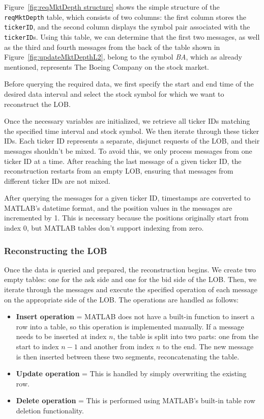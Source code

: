 \documentclass[a4paper,oneside,onecolumn,12pt]{book}
\begin{document}
			Figure~\ref{fig:reqMktDepth structure} shows the simple structure of the \texttt{reqMktDepth} table, which consists of two columns: the first column stores the \texttt{tickerID}, and the second column displays the symbol pair associated with the \texttt{tickerID}s. Using this table, we can determine that the first two messages, as well as the third and fourth messages from the back of the table shown in Figure~\ref{fig:updateMktDepthL2}, belong to the symbol \textit{BA}, which as already mentioned, represents The Boeing Company on the stock market.

			Before querying the required data, we first specify the start and end time of the desired data interval and select the stock symbol for which we want to reconstruct the LOB.

			Once the necessary variables are initialized, we retrieve all ticker IDs matching the specified time interval and stock symbol. We then iterate through these ticker IDs. Each ticker ID represents a separate, disjunct requests of the LOB, and their messages shouldn't be mixed. To avoid this, we only process messages from one ticker ID at a time. After reaching the last message of a given ticker ID, the reconstruction restarts from an empty LOB, ensuring that messages from different ticker IDs are not mixed.

			After querying the messages for a given ticker ID, timestamps are converted to MATLAB's datetime format, and the position values in the messages are incremented by 1. This is necessary because the positions originally start from index 0, but MATLAB tables don't support indexing from zero.

		\subsubsection{Reconstructing the LOB}  
			Once the data is queried and prepared, the reconstruction begins. We create two empty tables: one for the ask side and one for the bid side of the LOB. Then, we iterate through the messages and execute the specified operation of each message on the appropriate side of the LOB. The operations are handled as follows:
			\begin{itemize}
				\item \textbf{Insert operation} = MATLAB does not have a built-in function to insert a row into a table, so this operation is implemented manually. If a message needs to be inserted at index $n$, the table is split into two parts: one from the start to index $n-1$ and another from index $n$ to the end. The new message is then inserted between these two segments, reconcatenating the table.  
				\item \textbf{Update operation} = This is handled by simply overwriting the existing row.  
				\item \textbf{Delete operation} = This is performed using MATLAB's built-in table row deletion functionality.  
			\end{itemize}
\end{document}
